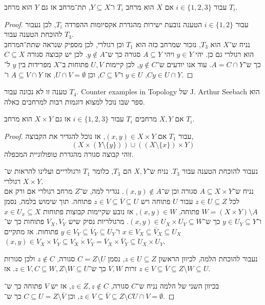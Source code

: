 \begin{proposition}
	עבור $i \in \{1, 2, 3\}$ אם $X$ הוא מרחב $T_i$ ו־$Y \subseteq X$, תת־מרחב אז גם $Y$ הוא מרחב $T_i$.
\end{proposition}
\begin{proof}
	עבור $i \in \{1, 2\}$ הטענה נובעת ישירות מהגדרת אקסיומות ההפרדה $T_i$, לכן נעבור להוכחת הטענה עבור $T_3$. \\
	נניח ש־$X$ הוא $T_3$, נזכור שמרחב כזה הוא $T_1$ וכן רגולרי, לכן מספיק שנראה שתת־המרחב הוא רגולרי גם כן.
	יהי $y \in Y$ ויהי $A \subseteq Y$ סגורה כך ש־$y \notin A$.
	לכן יש קבוצה סגורה $C \subseteq X$ כך ש־$A = C \cap Y$.
	עוד אנו יודעים ש־$y \notin C$,
	לכן קיימות $U, V$ פתוחות ב־$X$ מפרידות בין $y$ ל־$C$, $y \in U$ ו־$C \subseteq V$, וכן $U \cap V = \emptyset$,
	אז $A \subseteq V \cap Y$ ו־$y \in U \cap Y$.
\end{proof}
\begin{remark}
	טענה זו לא נכונה עבור $T_4$.
	Counter examples in Topology של J. Arthur Seebach הוא ספר שבו נוכל למצוא דוגמות רבות למרחבים כאלה.
\end{remark}
\begin{proposition}
	אם $X, Y$ מרחבים $T_i$ עבור $i \in \{1, 2, 3\}$ אז גם $X \times Y$ הוא מרחב $T_i$.
\end{proposition}
\begin{proof}
	עבור $T_1$ אם $(x, y) \in X \times Y$, אז נוכל להגדיר את הקבוצה,
	\[
		(X \times (Y \setminus \{y\})) \cup ((X \setminus \{x\}) \times Y)
	\]
	זוהי קבוצה סגורה מהגדרת טופולוגיית המכפלה.

	נעבור להוכחת הטענה עבור $T_3$.
	נניח ש־$X, Y$ הם $T_3$, כלומר $T_1$ ורגולריים ועלינו להראות ש־$X \times Y$ רגולרי. \\
	נניח ש־$A \subseteq X \times Y$ סגורה וכן ש־$(x, y) \notin A$.
	נגדיר למה, ש־$Z$ מרחב רגולרי אם ורק אם לכל $z \in U \subseteq Z$ עבור $U$ פתוחה ויש $z \in V \subseteq \overline{V} \subseteq U$ פתוחה.
	תוך שימוש בלמה, נסמן $W = (X \times Y) \setminus A$ פתוחה, $(x, y) \in W$, אז נובע שקיימות קבוצות פתוחות $x \in U_x \subseteq X$ ו־$y \in U_Y \subseteq Y$ כך ש־$(x, y) \in U_X \times U_Y \subseteq W$.
	מרגולריות נסיק שיש $V_X, V_Y$ פתוחות כך ש־$x \in V_X \subseteq \overline{V}_X \subseteq U_X$ ו־$y \in V_Y \subseteq \overline{V}_Y \subseteq U_Y$ פתוחות.
	אז מתקיים $(x, y) \in V_X \times V_Y \subseteq \overline{V_X \times V_Y} = \overline{V}_X \times \overline{V}_Y \subseteq U_X \times U_Y$.

	נעבור להוכחת הלמה, לכיוון הראשון $z \in U \subseteq Z$, נסמן $C = Z \setminus U$ סגורה, $z \notin C$ ולכן סגורות זרות $V, W$ כך ש־$z \in V, C \subseteq W, Z \setminus W \subseteq U$.
	אז $z \in V \subseteq \overline{V} \subseteq Z \setminus W \subseteq U$.

	בכיוון השני של הלמה נניח ש־$C$ סגורה, $z \in Z, z \notin C$, אז יש $V$ פתוחה כך ש־$z \in V \subseteq \overline{V} \subseteq Z \setminus C$, וכן $C \subseteq U = Z \setminus \overline{V}$ כך ש־$U \cap V = \emptyset$.
\end{proof}
